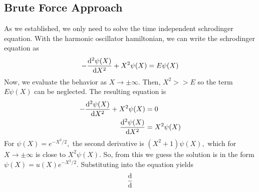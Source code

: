 \subsection{Brute Force Approach}
As we established, we only need to solve the time independent schrodinger equation. With the harmonic oscillator hamiltonian, we can write the schrodinger equation as
\begin{align}
    -\derivative{^2\psi(X)}{X^2}+X^2\psi(X)=E\psi(X)
\end{align}
Now, we evaluate the behavior as \(X\to\pm\infty.\) Then, \(X^2>>E\) so the term \(E\psi(X)\) can be neglected. The resulting equation is
\begin{align}
    -\derivative{^2\psi(X)}{X^2}+X^2\psi(X)&=0\\
    \derivative{^2\psi(X)}{X^2}&=X^2\psi(X)
\end{align}
For \(\psi(X)=e^{-X^2/2},\) the second derivative is \((X^2+1)\psi(X),\) which for \(X\to\pm\infty\) is close to \(X^2\psi(X)\). So, from this we guess the solution is in the form \(\psi(X)=u(X)e^{-X^2/2}\). Substituting into the equation yields
\begin{align}
    \derivative{}{}
\end{align}